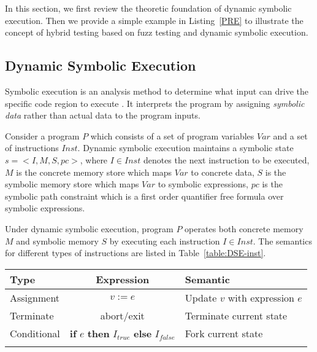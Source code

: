 In this section, we first review the theoretic foundation of dynamic symbolic execution. Then we provide a simple example in Listing~\ref{PRE} to illustrate the concept of hybrid testing based on fuzz testing and dynamic symbolic execution.

\subsection{Dynamic Symbolic Execution}
Symbolic execution is an analysis method to determine what input can drive the specific code region to execute \cite{King:Symbex}. It interprets the program by assigning \textit{symbolic data} rather than actual data to the program inputs. 

Consider a program $P$ which consists of a set of program variables $Var$ and a set of instructions $Inst$.
 Dynamic symbolic execution maintains a symbolic state $s=<I,M,S,pc>$, where $I\in Inst$ denotes the next instruction to be executed, $M$ is the concrete memory store which maps $Var$ to concrete data, $S$ is the symbolic memory store which maps $Var$ to symbolic expressions, $pc$ is the symbolic path constraint which is a first order quantifier free formula over symbolic expressions.

Under dynamic symbolic execution, program $P$ operates both concrete memory $M$ and symbolic memory $S$ by executing each instruction $I\in Inst$. The semantics for different types of instructions are listed in Table~\ref{table:DSE-inst}.

\begin{table}[!b]
{\begin{tabular*}{20pc}{@{\extracolsep{\fill}}lcl@{}}\toprule
Type  & Expression & Semantic\\
\midrule
Assignment   &  $v:=e$ & Update $v$ with expression $e$\\
Terminate    &  abort/exit & Terminate current state \\
Conditional  &  \textbf{if} $e$ \textbf{then} $I_{true}$ \textbf{else} $I_{false}$ & Fork current state\\
\botrule
\end{tabular*}}{}
\end{table}

